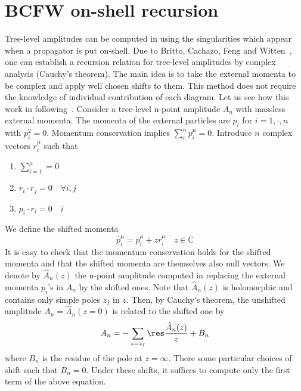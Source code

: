 \section{BCFW on-shell recursion}\label{sect-bcfw}
Tree-level amplitudes can be computed in using the singularities which appear when a propagator is put on-shell. 
Due to Britto, Cachazo, Feng and Witten~\cite{BRITTO2005499, PhysRevLett.94.181602}, one can establish a recursion relation for tree-level amplitudes by complex analysis (Cauchy's theorem).
The main idea is to take the external momenta to be complex and apply well chosen shifts to them.
This method does not require the knowledge of individual contribution of each diagram.
Let us see how this work in following~\cite{Elvang:2013cua}.
Consider a tree-level n-point amplitude $A_n$ with massless external momenta.
The momenta of the external particles are $p_i$ for $i=1, \cdot, n$ with $p^2_i = 0$. 
Momentum conservation implies $\sum_i^n p_i^\mu = 0$. 
Introduce $n$ complex vectors $r^{\mu}_i$ such that
\begin{enumerate}
\item $\sum_{i=1}^{\mu} = 0$
\item $r_i\cdot r_j = 0 \quad\forall i,j$
\item $p_i \cdot r_i = 0 \quad i$
\end{enumerate}
We define the shifted momenta
\begin{equation*}
\hat{p}^\mu_i = p_i^{\mu} + z r_i^{\mu} \quad z\in\mathbb{C}
\end{equation*} 
It is easy to check that the momentum conservation holds for the shifted momenta and that the shifted momenta are themselves also null vectors.
We denote by $\hat{A}_n(z)$ the n-point amplitude computed in replacing the external momenta $p_i$'s in $A_n$ by the shifted ones. 
Note that $\hat{A}_n(z)$ is holomorphic and contains only simple poles $z_I$ in $z$.
Then, by Cauchy's theorem, the unshifted amplitude $A_n = \hat{A}_n(z=0)$ is related to the shifted one by
\begin{equation}\label{residue}
A_n = - \sum_{z = z_I}\res\frac{\hat{A}_n(z)}{z} + B_n
\end{equation} 
where $B_n$ is the residue of the pole at $z = \infty$.
There some particular choices of shift such that $B_n = 0$.
Under these shifts, it suffices to compute only the first term of the above equation. 
